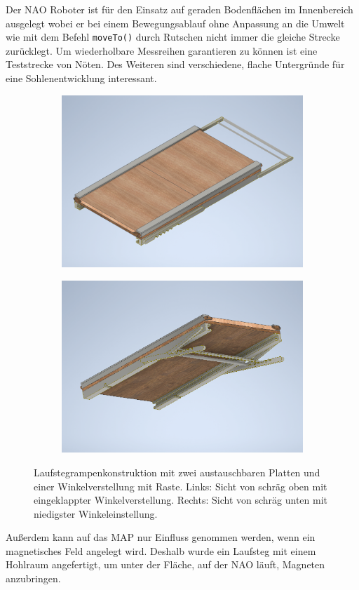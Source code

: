 Der NAO Roboter ist für den Einsatz auf geraden Bodenflächen im Innenbereich ausgelegt wobei er bei einem Bewegungsablauf ohne Anpassung an die Umwelt wie mit dem Befehl \texttt{moveTo()} durch Rutschen nicht immer die gleiche Strecke zurücklegt. 
Um wiederholbare Messreihen garantieren zu können ist eine Teststrecke von Nöten. Des Weiteren sind verschiedene, flache Untergründe für eine Sohlenentwicklung interessant.
\begin{figure}[hb]
	\hfill
	\begin{subfigure}[c]{.49\linewidth}
		\centering
		\includegraphics[width=\linewidth]{Bilder/Rampe_oben.png}
	\end{subfigure}
	\begin{subfigure}[c]{.49\linewidth}
		\centering
		\includegraphics[width=\linewidth]{Bilder/Rampe_unten.png}
	\end{subfigure}
	\hfill
	\caption{Laufstegrampenkonstruktion mit zwei austauschbaren Platten und einer Winkelverstellung mit Raste. Links: Sicht von schräg oben mit eingeklappter Winkelverstellung. Rechts: Sicht von schräg unten mit niedigster Winkeleinstellung.}
	\label{Rampe_Inventor}
\end{figure}
Außerdem kann auf das MAP nur Einfluss genommen werden, wenn ein magnetisches Feld angelegt wird. Deshalb wurde ein Laufsteg mit einem Hohlraum angefertigt, um unter der Fläche, auf der NAO läuft, Magneten anzubringen. 

